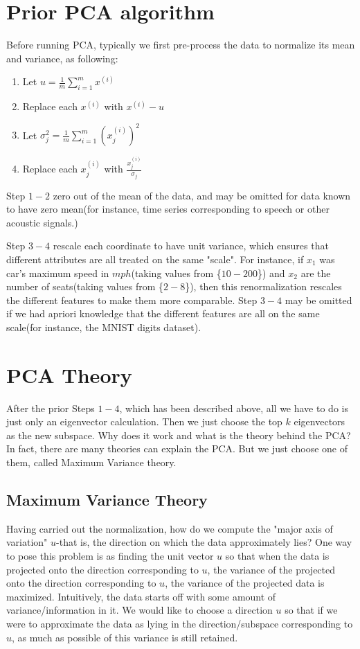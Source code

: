 \documentclass[a4paper]{article}
\begin{document}
\section{Prior PCA algorithm}

Before running PCA, typically we first pre-process the data to normalize its mean and variance, as following:

\begin{enumerate}
\item Let $u = \frac{1}{m} \sum_{i=1}^{m} x^{(i)}$
    \item Replace each $x^{(i)}$ with $x^{(i)} - u$
    \item Let $\sigma_j^2 = \frac{1}{m} \sum_{i=1}^{m} (x_j^{(i)})^2$
    \item Replace each $x_j^{(i)}$ with $\frac{x_j^{(i)}}{\sigma_j}$
\end{enumerate}

Step $1-2$ zero out of the mean of the data, and may be omitted for data known to have zero mean(for instance, time series corresponding to speech or other acoustic signals.) 

Step $3-4$ rescale each coordinate to have unit variance, which ensures that different attributes are all treated on the same "scale". For instance, if $x_1$ was car's maximum speed in $mph$(taking values from \{$10-200$\}) and $x_2$ are the number of seats(taking values from \{$2-8$\}), then this renormalization rescales the different features to make them more comparable. Step $3-4$ may be omitted if we had apriori knowledge that the different features are all on the same scale(for instance, the MNIST digits dataset).


\section{PCA Theory}

After the prior Steps $1-4$, which has been described above, all we have to do is just only an eigenvector calculation. Then we just choose the top $k$ eigenvectors as the new subspace. Why does it work and what is the theory behind the PCA? In fact, there are many theories can explain the PCA. But we just choose one of them, called Maximum Variance theory.

\subsection{Maximum Variance Theory}

Having carried out the normalization, how do we compute the "major axis of variation" $u$-that is, the direction on which the data approximately lies? One way to pose this problem is as finding the unit vector $u$ so that when the data is projected onto the direction corresponding to $u$, the variance of the projected onto the direction corresponding to $u$, the variance of the projected data is maximized. Intuitively, the data starts off with some amount of variance/information in it. We would like to choose a direction $u$ so that if we were to approximate the data as lying in the direction/subspace corresponding to $u$, as much as possible of this variance is still retained.
\end{document}
